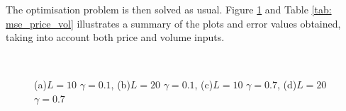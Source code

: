 \noindent The optimisation problem is then solved as usual. Figure \ref{fig: behave_price_vol} and Table \ref{tab: mse_price_vol} illustrates a summary of the plots and error values obtained, taking into account both price and volume inputs.

\begin{figure}[h!]
  \centering
  \quad
  \\
  \quad
  \caption{(a)$L=10$ $\gamma=0.1$, (b)$L=20$ $\gamma=0.1$, (c)$L=10$ $\gamma=0.7$, (d)$L=20$ $\gamma=0.7$}
  \label{fig: behave_price_vol}
\end{figure}

